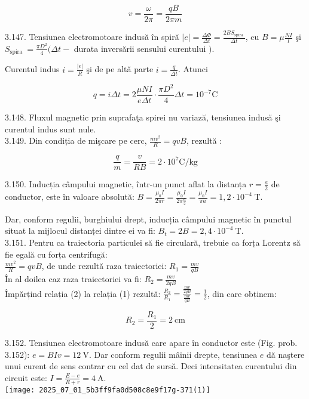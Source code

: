$$
v=\frac{\omega}{2 \pi}=\frac{q B}{2 \pi m}
$$

3.147. Tensiunea electromotoare indusă în spiră $|e|=\frac{\Delta \Phi}{\Delta t}=\frac{2 B S_{\text {spira }}}{\Delta t}$, cu $B=\mu \frac{N I}{l}$ şi $S_{\text {spira }}=\frac{\pi D^{2}}{4}(\Delta t-$ durata inversării sensului curentului $)$.

Curentul indus $i=\frac{|e|}{R}$ şi de pe altă parte $i=\frac{q}{\Delta t}$. Atunci

$$
q=i \Delta t=2 \frac{\mu N I}{e \Delta t} \cdot \frac{\pi D^{2}}{4} \Delta t=10^{-7} \mathrm{C}
$$

3.148. Fluxul magnetic prin suprafaţa spirei nu variază, tensiunea indusă şi curentul indus sunt nule.\\
3.149. Din condiția de mişcare pe cerc, $\frac{m v^{2}}{R}=q v B$, rezultă :

$$
\frac{q}{m}=\frac{v}{R B}=2 \cdot 10^{7} \mathrm{C} / \mathrm{kg}
$$

3.150. Inducția câmpului magnetic, într-un punct aflat la distanța $r=\frac{a}{2}$ de conductor, este în valoare absolută: $B=\frac{\mu_{0} I}{2 \pi r}=\frac{\mu_{0} I}{2 \pi \frac{a}{2}}=\frac{\mu_{0} I}{\pi a}=1,2 \cdot 10^{-4} \mathrm{~T}$.

Dar, conform regulii, burghiului drept, inducția câmpului magnetic în punctul situat la mijlocul distanței dintre ei va fi: $B_{t}=2 B=2,4 \cdot 10^{-4} \mathrm{~T}$.\\
3.151. Pentru ca traiectoria particulei să fie circulară, trebuie ca forța Lorentz să fie egală cu forța centrifugă:\\
$\frac{m v^{2}}{R}=q v B$, de unde rezultă raza traiectoriei: $R_{1}=\frac{m v}{q B}$\\
În al doilea caz raza traiectoriei va fi: $R_{2}=\frac{m v}{2 q B}$\\
Împărțind relația (2) la relația (1) rezultă: $\frac{R_{2}}{R_{1}}=\frac{\frac{m v}{2 q B}}{\frac{m v}{q B}}=\frac{1}{2}$, din care obținem:

$$
R_{2}=\frac{R_{1}}{2}=2 \mathrm{~cm}
$$

3.152. Tensiunea electromotoare indusă care apare în conductor este (Fig. prob. 3.152): $e=B I v=12 \mathrm{~V}$. Dar conform regulii mâinii drepte, tensiunea $e$ dă naştere unui curent de sens contrar cu cel dat de sursă. Deci intensitatea curentului din circuit este: $I=\frac{E-e}{R+r}=4 \mathrm{~A}$.\\
\texttt{[image: 2025\_07\_01\_5b3ff9fa0d508c8e9f17g-371(1)]}

